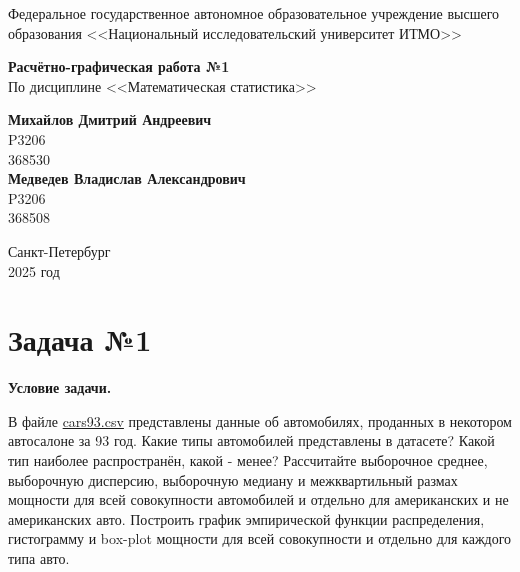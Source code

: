\documentclass[12pt]{article}
\begin{document}
\begin{titlepage}
    \begin{center}
        \large{Федеральное государственное автономное образовательное учреждение высшего образования <<Национальный исследовательский университет ИТМО>>}
    \end{center}
    
    \vspace{15em}
    
    \begin{center}
        \huge{\textbf{Расчётно-графическая работа №1}} \\
        \large{По дисциплине <<Математическая статистика>>}
    \end{center}
    
    \vspace{5em}
    
    \begin{flushright}
        \Large{\textbf{Михайлов Дмитрий Андреевич}} \\
        \Large{P3206} \\
        \Large{368530} \\
        \Large{\textbf{Медведев Владислав Александрович}} \\
        \Large{P3206} \\
        \Large{368508}
    \end{flushright}
    
    \vspace{10em}
    
    \begin{center}
        Санкт-Петербург \\
        2025 год
    \end{center}
\end{titlepage}

\tableofcontents
\newpage

\section*{Задача №1}

\textbf{Условие задачи.}

В файле \href{https://drive.google.com/file/d/1vv2jGNp6EO8HHRoscDRQU90faR3j8iTN/view}{cars93.csv} представлены данные об автомобилях, проданных в некотором автосалоне за 93 год. Какие типы автомобилей представлены в датасете? Какой тип наиболее распространён, какой - менее? Рассчитайте выборочное среднее, выборочную дисперсию, выборочную медиану и межквартильный размах мощности для всей совокупности автомобилей и отдельно для американских и не американских авто. Построить график эмпирической функции распределения, гистограмму и box-plot мощности для всей совокупности и отдельно для каждого типа авто.
\end{document}
